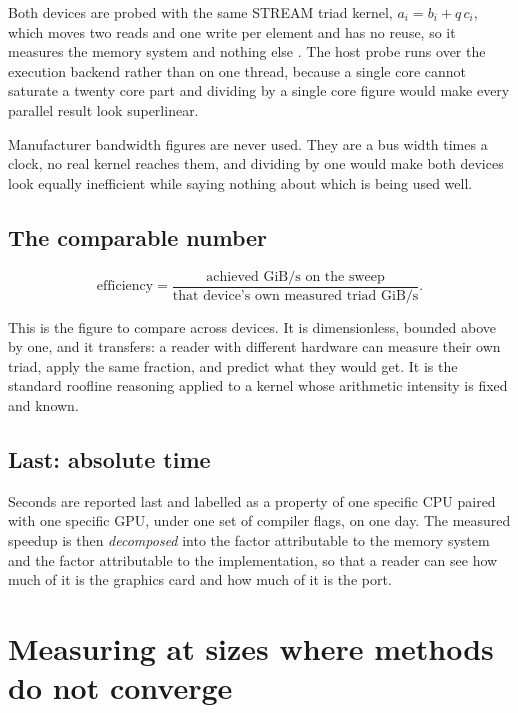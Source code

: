 Both devices are probed with the same STREAM triad kernel,
$a_i = b_i + q\,c_i$, which moves two reads and one write per element and has no
reuse, so it measures the memory system and nothing else \cite{mccalpin1995}.
The host probe runs over the execution backend rather than on one thread,
because a single core cannot saturate a twenty core part and dividing by a
single core figure would make every parallel result look superlinear.

Manufacturer bandwidth figures are never used. They are a bus width times a
clock, no real kernel reaches them, and dividing by one would make both devices
look equally inefficient while saying nothing about which is being used well.

\subsection{The comparable number}

\begin{equation}
  \text{efficiency} =
  \frac{\text{achieved GiB/s on the sweep}}
       {\text{that device's own measured triad GiB/s}} .
  \label{eq:efficiency}
\end{equation}

This is the figure to compare across devices. It is dimensionless, bounded above
by one, and it transfers: a reader with different hardware can measure their own
triad, apply the same fraction, and predict what they would get. It is the
standard roofline reasoning \cite{williams2009} applied to a kernel whose
arithmetic intensity is fixed and known.

\subsection{Last: absolute time}

Seconds are reported last and labelled as a property of one specific CPU paired
with one specific GPU, under one set of compiler flags, on one day. The measured
speedup is then \emph{decomposed} into the factor attributable to the memory
system and the factor attributable to the implementation, so that a reader can
see how much of it is the graphics card and how much of it is the port.

\section{Measuring at sizes where methods do not converge}


